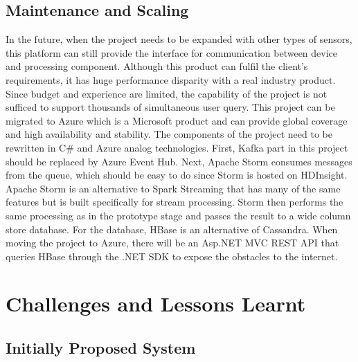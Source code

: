\documentclass[prodmode,acmtosem]{acmsmall} %
\begin{document}
\subsection{Maintenance and Scaling}
In the future, when the project needs to be expanded with other types of sensors, this platform can still provide the interface for communication between device and processing component. 
Although this product can fulfil the client’s requirements, it has huge performance disparity with a real industry product. Since budget and experience are limited, the capability of the project is not sufficed to support thousands of simultaneous user query.
This project can be migrated to Azure which is a Microsoft product and can provide global coverage and high availability and stability. The components of the project need to be rewritten in C\# and Azure analog technologies. First, Kafka part in this project should be replaced by Azure Event Hub. Next, Apache Storm consumes messages from the queue, which should be easy to do since Storm is hosted on HDInsight. Apache Storm is an alternative to Spark Streaming that has many of the same features but is built specifically for stream processing. Storm then performs the same processing as in the prototype stage and passes the result to a wide column store database. For the database, HBase is an alternative of Cassandra. When moving the project to Azure,  there will be an Asp.NET MVC REST API that queries HBase through the .NET SDK to expose the obstacles to the internet.

\section{Challenges and Lessons Learnt}
\subsection{Initially Proposed System}
\label{sec:Prelim}


\end{document}
